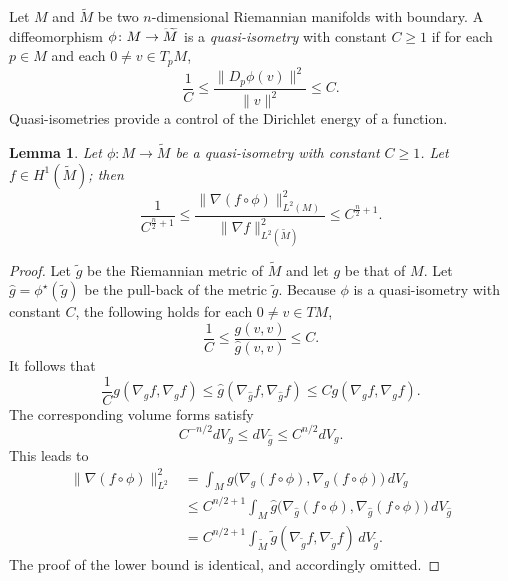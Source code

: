 \documentclass{CUP-JNL-FMP}%
\newtheorem{lemma}[theorem]{Lemma}
\theoremstyle{definition}
\numberwithin{equation}{section}
\begin{document}
Let $M$ and $\widetilde{M}$ be two $n$-dimensional Riemannian manifolds with boundary. A diffeomorphism $\phi\colon M\rightarrow\smash{\widetilde{M}}$ is a \emph{quasi-isometry} with constant $C\geq 1$ if for each $p\in M$ and each $0\neq v\in T_pM$,
$$\frac{1}{C}\leq\frac{\|D_p\phi(v)\|^2}{\|v\|^2}\leq C.$$
Quasi-isometries provide a control of the Dirichlet energy of a function.
\begin{lemma}\label{lemma:QIcontrolEnergy}
Let $\phi\colon M\rightarrow\widetilde{M}$ be a quasi-isometry with constant $C\geq 1$. Let $f\in H^1(\widetilde{M})$; then
$$\frac{1}{C^{\frac{n}{2}+1}}\leq\frac{\|\nabla (f\circ\phi)\|_{L^2(M)}^2}{\|\nabla f\|_{L^2(\widetilde{M})}^2}\leq C^{\frac{n}{2}+1}.$$
\end{lemma}
\begin{proof}
Let $\widetilde{g}$ be the Riemannian metric of $\widetilde{M}$ and let $g$ be that of $M$. Let $\widehat{g}=\phi^\star(\widetilde{g})$ be the pull-back of the metric $\widetilde{g}$. Because $\phi$ is a quasi-isometry with constant $C$, the following holds for each $0\neq v\in TM$,
$$\frac{1}{C}\leq \frac{g(v,v)}{\widehat{g}(v,v)}\leq C.$$
It follows that
$$\frac{1}{C}g(\nabla_{g}f,\nabla_{g}f)\leq\widehat{g}(\nabla_{\widehat{g}}f,\nabla_{\widehat{g}}f)\leq Cg(\nabla_{g}f,\nabla_{g}f).$$
The corresponding volume forms satisfy
$$C^{-n/2}dV_g\leq dV_{\widehat{g}}\leq C^{n/2}dV_g.$$
This leads to
\begin{align*}
\|\nabla (f\circ\phi)\|_{L^2}^2&=\int_M g\bigl(\nabla_g (f\circ\phi),\nabla_g(f\circ\phi)\bigr)\,dV_g\\
&\leq
C^{n/2+1}\int_M {\widehat{g}}\bigl(\nabla_{\widehat{g}} (f\circ\phi),\nabla_{\widehat{g}} (f\circ\phi)\bigr)\,dV_{\widehat{g}}\\
&=
C^{n/2+1}\int_{\widetilde{M}} {\widetilde{g}}(\nabla_{\widetilde{g}} f,\nabla_{\widetilde{g}} f)\,dV_{\widetilde{g}}.
\end{align*}
The proof of the lower bound is identical, and accordingly omitted.
\end{proof}
\end{document}
